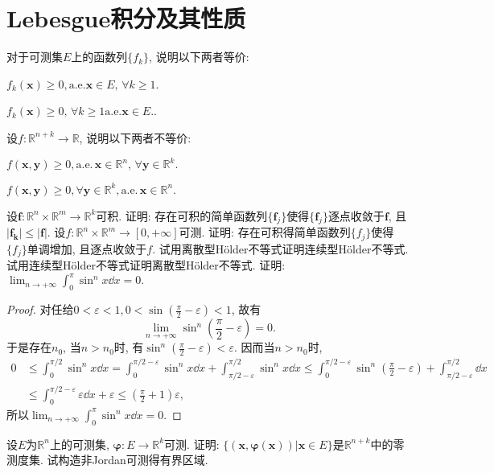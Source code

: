  \section{Lebesgue积分及其性质}
\begin{quiza}
\woe 对于可测集\(E\)上的函数列\(\{f_k\}\), 说明以下两者等价:\begin{compactenum}[(i)]
\item \(f_k(\boldsymbol{x})\geqslant 0,\mathrm{a.e. }\boldsymbol{x}\in E,\,\forall k\geqslant 1\).
\item \(f_k(\boldsymbol{x})\geqslant 0,\,\forall k\geqslant 1\mathrm{a.e. }\boldsymbol{x}\in E.\).
\end{compactenum}
\woe 设\(f:\mathbb{R}^{n+k}\rightarrow\mathbb{R}\), 说明以下两者不等价:\begin{compactenum}[(i)]
\item \(f(\boldsymbol{x},\boldsymbol{y})\geqslant 0,\mathrm{a.e.\,}\boldsymbol{x}\in\mathbb{R}^n,\,\forall\boldsymbol{y}\in\mathbb{R}^k.\)
\item \(f(\boldsymbol{x},\boldsymbol{y})\geqslant 0,\forall\boldsymbol{y}\in\mathbb{R}^k,\mathrm{a.e.\,}\boldsymbol{x}\in\mathbb{R}^n.\)
\end{compactenum}
\woe 设\(\boldsymbol{f}:\mathbb{R}^n\times\mathbb{R}^{m}\rightarrow\mathbb{R}^k\)可积. 证明: 存在可积的简单函数列\(\{\boldsymbol{f}_j\}\)使得\(\{\boldsymbol{f}_j\}\)逐点收敛于\(\boldsymbol{f}\), 且\(|\boldsymbol{f_k}|\leqslant|\boldsymbol{f}|.\)
\woe 设\(f:\mathbb{R}^n\times\mathbb{R}^m\rightarrow [0,+\infty]\)可测. 证明: 存在可积得简单函数列\(\{f_j\}\)使得\(\{f_j\}\)单调增加, 且逐点收敛于\(f\).
\woe 试用离散型H\"{o}lder不等式证明连续型H\"{o}lder不等式.
\woe 试用连续型H\"{o}lder不等式证明离散型H\"{o}lder不等式.
\woe 证明: \(\lim_{n\rightarrow+\infty}\int_{0}^{\pi}\sin^nx\dd x=0.\)
\begin{proof}
对任给\(0<\varepsilon<1,0<\sin\left(\frac{\pi}{2}-\varepsilon\right)<1\), 故有\[\lim_{n\rightarrow+\infty}\sin^n\left(\frac{\pi}{2}-\varepsilon\right)=0.\]于是存在\(n_0\), 当\(n>n_0\)时, 有\(\sin^n\left(\frac{\pi}{2}-\varepsilon\right)<\varepsilon\). 因而当\(n>n_0\)时,\[\begin{split}
0&\leqslant\int_{0}^{\pi/2}\sin^nx\dd x=\int_{0}^{\pi/2-\varepsilon}\sin^nx\dd x+\int_{\pi/2-\varepsilon}^{\pi/2}\sin^nx\dd x\leqslant\int_{0}^{\pi/2-\varepsilon}\sin^n\left(\frac{\pi}{2}-\varepsilon\right)+\int_{\pi/2-\varepsilon}^{\pi/2}\dd x\\&\leqslant\int_{0}^{\pi/2-\varepsilon}\varepsilon\dd x+\varepsilon\leqslant\left(\frac{\pi}{2}+1\right)\varepsilon,
\end{split}\]所以\(\lim_{n\rightarrow+\infty}\int_{0}^{\pi}\sin^nx\dd x=0.\)
\end{proof}
\woe 设\(E\)为\(\mathbb{R}^n\)上的可测集, \(\boldsymbol{\varphi}:E\rightarrow\mathbb{R}^k\)可测. 证明: \(\{(\boldsymbol{x},\boldsymbol{\varphi}(\boldsymbol{x}))\big|\boldsymbol{x}\in E\}\)是\(\mathbb{R}^{n+k}\)中的零测度集.
\woe 试构造非Jordan可测得有界区域.
\end{quiza}
